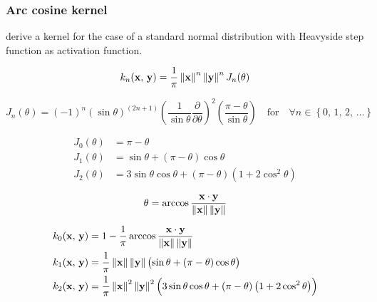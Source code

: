 \subsubsection{Arc cosine kernel}

\Textcite{choLargemarginClassificationInfinite2010} derive a kernel for the case of a standard normal
distribution with Heavyside step function as activation function.

\begin{equation}\label{eq:kernel_cho}
	k_n(\mathbf{x},\,\mathbf{y}) = \frac{1}{\pi} \left\lVert \mathbf{x} \right\rVert^n \left\lVert \mathbf{y} \right\rVert^n J_n(\theta)
\end{equation}

\begin{equation}
	J_n(\theta) = (-1)^n \left( \sin \theta \right)^{(2n+1)}
	\left( \frac{1}{\sin \theta} \frac{\partial}{\partial \theta} \right)^2
	\left( \frac{\pi - \theta}{\sin \theta} \right)
	\quad \text{for} \quad \forall n \in \left\{ 0,\,1,\,2,\,\dots \right\}
\end{equation}

\begin{align}
	J_0(\theta) & = \pi - \theta                                                                    \\
	J_1(\theta) & = \sin\theta + \left(\pi - \theta\right)\cos\theta                                \\
	J_2(\theta) & = 3\sin\theta\cos\theta + \left(\pi - \theta\right)\left(1 + 2\cos^2\theta\right)
\end{align}

\begin{equation}
	\theta = \arccos\frac{\mathbf{x} \cdot \mathbf{y}}{\left\lVert \mathbf{x} \right\rVert \left\lVert \mathbf{y} \right\rVert}
\end{equation}


\begin{align}
	k_0(\mathbf{x},\,\mathbf{y}) & = 1 - \frac{1}{\pi} \arccos\frac{\mathbf{x} \cdot \mathbf{y}}{\left\lVert \mathbf{x} \right\rVert \left\lVert \mathbf{y} \right\rVert} \\
	k_1(\mathbf{x},\,\mathbf{y}) & = \frac{1}{\pi} \left\lVert \mathbf{x} \right\rVert \left\lVert \mathbf{y} \right\rVert
	\bigl( \sin\theta + \left(\pi - \theta\right)\cos\theta \bigr)                                                        \\
	k_2(\mathbf{x},\,\mathbf{y}) & = \frac{1}{\pi} \left\lVert \mathbf{x} \right\rVert^2 \left\lVert \mathbf{y} \right\rVert^2
	\Bigl( 3\sin\theta\cos\theta + \left(\pi - \theta\right)\left(1 + 2\cos^2\theta\right) \Bigr)
\end{align}

